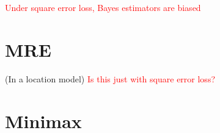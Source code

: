 \documentclass{article}
\newcommand\myworries[1]{\textcolor{red}{#1}}
\begin{document}
\begin{fact}
\myworries{Under square error loss, Bayes estimators are biased }
\end{fact}

\section{MRE}
\begin{fact}
(In a location model)
\myworries{Is this just with square error loss?}

\end{fact}
\section{Minimax}
\end{document}
